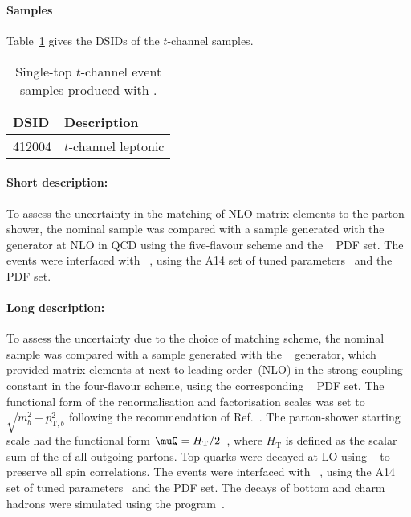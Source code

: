 \subsubsection[MadGraph5\_aMC@NLO+Pythia8]{\MGNLOPY[8]}
\label{subsubsec:tchan_aMCP8}

\paragraph{Samples}

Table~\ref{tab:tchan_aMCP8} gives the DSIDs of the $t$-channel \MGNLOPY[8] samples.

\begin{table}[htbp]
  \caption{Single-top $t$-channel event samples produced with \MGNLOPY[8].}%
  \label{tab:tchan_aMCP8}
  \centering
  \begin{tabular}{l l}
    \toprule
    DSID & Description \\
    \midrule
    412004 & $t$-channel leptonic \\
    \bottomrule
  \end{tabular}
\end{table}

\paragraph{Short description:}

To assess the uncertainty in the matching of NLO matrix elements to the
parton shower, the nominal sample was compared with a sample generated
with the \MGNLO[2.6.2]~\cite{Alwall:2014hca} generator at NLO in QCD using the five-flavour
scheme and the \NNPDF[2.3nlo]~\cite{Ball:2014uwa} PDF set. The events were
interfaced with \PYTHIA[8.230]~\cite{Sjostrand:2014zea}, using the A14
set of tuned parameters~\cite{ATL-PHYS-PUB-2014-021} and the \NNPDF[2.3lo] PDF set.


\paragraph{Long description:}

To assess the uncertainty due to the choice of matching scheme, the nominal sample was compared with a sample generated
with the \MGNLO[2.6.2]~\cite{Alwall:2014hca} generator, which provided matrix elements at next-to-leading order~(NLO) in the strong coupling constant \alphas
in the four-flavour scheme, using the corresponding \NNPDF[3.0nlo]~\cite{Ball:2014uwa} PDF set.
The functional form of the renormalisation and factorisation scales was set to $\sqrt{m_b^2 + p_{\text{T},b}^2}$
following the recommendation of Ref.~\cite{Frederix:2012dh}.
The parton-shower starting scale had the functional form $\muQ = H_\text{T}/2$~\cite{ATL-PHYS-PUB-2017-007}, 
where $H_\text{T}$ is defined as the scalar sum of the \pT of all outgoing partons.
Top quarks were decayed at LO using \MADSPIN~\cite{Frixione:2007zp,Artoisenet:2012st} to preserve all spin correlations.
The events were interfaced with \PYTHIA[8.230]~\cite{Sjostrand:2014zea}, using the A14 set of tuned parameters~\cite{ATL-PHYS-PUB-2014-021} 
and the \NNPDF[2.3lo] PDF set.
The decays of bottom and charm hadrons were simulated using the \EVTGEN[1.6.0] program~\cite{Lange:2001uf}.


